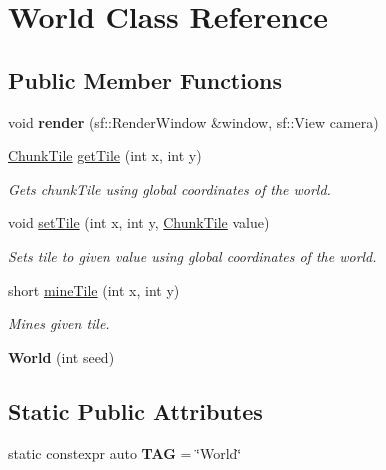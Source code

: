 \hypertarget{classWorld}{\section{World Class Reference}
\label{classWorld}
}
\subsection*{Public Member Functions}
\begin{DoxyCompactItemize}
\item 
\hypertarget{classWorld_ad41d823a21794ad47ac4478677b0ae7f}{void {\bfseries render} (sf\-::\-Render\-Window \&window, sf\-::\-View camera)}\label{classWorld_ad41d823a21794ad47ac4478677b0ae7f}

\item 
\hypertarget{classWorld_ad8d693762cae3c31ec90fef9b44b97bf}{\hyperlink{classChunkTile}{Chunk\-Tile} \hyperlink{classWorld_ad8d693762cae3c31ec90fef9b44b97bf}{get\-Tile} (int x, int y)}\label{classWorld_ad8d693762cae3c31ec90fef9b44b97bf}

\begin{DoxyCompactList}\small\item\em Gets chunk\-Tile using global coordinates of the world. \end{DoxyCompactList}\item 
\hypertarget{classWorld_a9d374f8600da3aa484e48a5887772340}{void \hyperlink{classWorld_a9d374f8600da3aa484e48a5887772340}{set\-Tile} (int x, int y, \hyperlink{classChunkTile}{Chunk\-Tile} value)}\label{classWorld_a9d374f8600da3aa484e48a5887772340}

\begin{DoxyCompactList}\small\item\em Sets tile to given value using global coordinates of the world. \end{DoxyCompactList}\item 
short \hyperlink{classWorld_a1bbfac1b517a991c30aa96b57d04d265}{mine\-Tile} (int x, int y)
\begin{DoxyCompactList}\small\item\em Mines given tile. \end{DoxyCompactList}\item 
\hypertarget{classWorld_a4598832293e050abba792d1b4367a368}{{\bfseries World} (int seed)}\label{classWorld_a4598832293e050abba792d1b4367a368}

\end{DoxyCompactItemize}
\subsection*{Static Public Attributes}
\begin{DoxyCompactItemize}
\item 
\hypertarget{classWorld_a9ebf0ccc9a330d5f3e4ed8401d64e5f6}{static constexpr auto {\bfseries T\-A\-G} = \char`\"{}World\char`\"{}}\label{classWorld_a9ebf0ccc9a330d5f3e4ed8401d64e5f6}

\end{DoxyCompactItemize}


